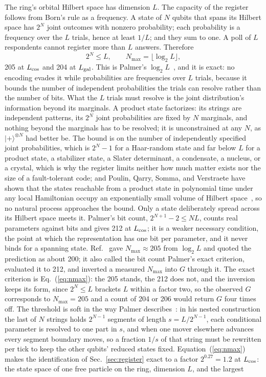 \documentclass[aps,prd,twocolumn,superscriptaddress,nofootinbib]{revtex4-2}
\begin{document}
The ring's orbital Hilbert space has dimension $L$. The capacity of the register follows from Born's rule as a frequency. A state of $N$ qubits that spans its Hilbert space has $2^N$ joint outcomes with nonzero probability; each probability is a frequency over the $L$ trials, hence at least $1/L$; and they sum to one. A poll of $L$ respondents cannot register more than $L$ answers. Therefore
\begin{equation}
2^N \le L, \qquad N_{\max} = \lfloor \log_2 L \rfloor ,
\label{eq:nmax}
\end{equation}
205 at $L_{\rm cos}$ and 204 at $L_{\rm gal}$. This is Palmer's $\log_2 L$~\cite{palmer2026}, and it is exact: no encoding evades it while probabilities are frequencies over $L$ trials, because it bounds the number of independent probabilities the trials can resolve rather than the number of bits. What the $L$ trials must resolve is the joint distribution's information beyond its marginals. A product state factorizes: its strings are independent patterns, its $2^N$ joint probabilities are fixed by $N$ marginals, and nothing beyond the marginals has to be resolved; it is unconstrained at any $N$, as $|{+}\rangle^{\otimes N}$ had better be. The bound is on the number of independently specified joint probabilities, which is $2^N - 1$ for a Haar-random state and far below $L$ for a product state, a stabilizer state, a Slater determinant, a condensate, a nucleus, or a crystal, which is why the register limits neither how much matter exists nor the size of a fault-tolerant code; and Poulin, Qarry, Somma, and Verstraete have shown that the states reachable from a product state in polynomial time under any local Hamiltonian occupy an exponentially small volume of Hilbert space~\cite{poulin2011}, so no natural process approaches the bound. Only a state deliberately spread across its Hilbert space meets it. Palmer's bit count, $2^{N+1}-2 \le NL$, counts real parameters against bits and gives 212 at $L_{\rm cos}$; it is a weaker necessary condition, the point at which the representation has one bit per parameter, and it never binds for a spanning state. Ref.~\cite{korytko2026} gave $N_{\max}\approx205$ from $\log_2 L$ and quoted the prediction as about 200; it also called the bit count Palmer's exact criterion, evaluated it to 212, and inverted a measured $N_{\max}$ into $G$ through it. The exact criterion is Eq.~(\ref{eq:nmax}): the 205 stands, the 212 does not, and the inversion keeps its form, since $2^N \le L$ brackets $L$ within a factor two, so the observed $G$ corresponds to $N_{\max} = 205$ and a count of 204 or 206 would return $G$ four times off. The threshold is soft in the way Palmer describes~\cite{palmer2026c}: in his nested construction the last of $N$ strings holds $2^{N-1}$ segments of length $s = L/2^{N-1}$, each conditional parameter is resolved to one part in $s$, and when one mover elsewhere advances every segment boundary moves, so a fraction $1/s$ of that string must be rewritten per tick to keep the other qubits' reduced states fixed. Equation~(\ref{eq:nmax}) makes the identification of Sec.~\ref{sec:register} exact to a factor $2^{0.27} = 1.2$ at $L_{\rm cos}$: the state space of one free particle on the ring, dimension $L$, and the largest 
\end{document}
